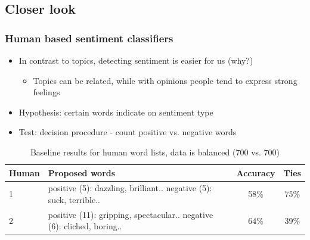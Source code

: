 \documentclass{beamer}
\begin{document}
\subsection{Closer look}
\begin{frame}
	\frametitle{Human based sentiment classifiers}
	\begin{itemize}
		\item In contrast to topics, detecting sentiment is easier for us (why?)
		\begin{itemize}
		
		\item Topics can be related, while with opinions people tend to express strong feelings
		\end{itemize}
		
		\item Hypothesis: certain words indicate on sentiment type
		
		\item Test: decision procedure - count positive vs. negative words
	\end{itemize}
	
	\begin{table}
		\scriptsize
		\begin{tabular}{ l | p{5cm} | c | c }
			Human & Proposed words & Accuracy & Ties \footnotemark \\ \hline \hline
			1 & positive (5): dazzling, brilliant.. \newline negative (5): suck, terrible.. & 58\% & 75\% \\ \hline
			2 & positive (11): gripping, spectacular.. \newline negative (6): cliched, boring.. & 64\% & 39\%  \\  \hline
		\end{tabular}
		\caption{Baseline results for human word lists, data is balanced (700 vs. 700)}
	\end{table}
	
\end{frame}
\end{document}
